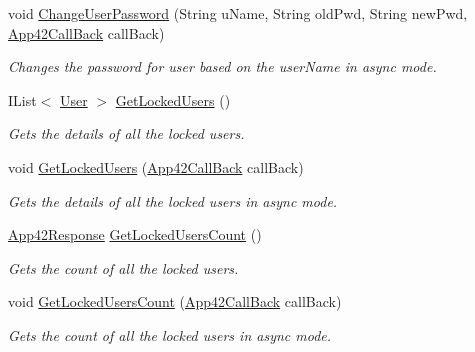 \begin{DoxyCompactItemize}
void \hyperlink{classcom_1_1shephertz_1_1app42_1_1paas_1_1sdk_1_1csharp_1_1user_1_1_user_service_a36687b837e50b3af4fd3d7345bb0870f}{Change\+User\+Password} (String u\+Name, String old\+Pwd, String new\+Pwd, \hyperlink{interfacecom_1_1shephertz_1_1app42_1_1paas_1_1sdk_1_1csharp_1_1_app42_call_back}{App42\+Call\+Back} call\+Back)
\begin{DoxyCompactList}\small\item\em Changes the password for user based on the user\+Name in async mode. \end{DoxyCompactList}\item 
I\+List$<$ \hyperlink{classcom_1_1shephertz_1_1app42_1_1paas_1_1sdk_1_1csharp_1_1user_1_1_user}{User} $>$ \hyperlink{classcom_1_1shephertz_1_1app42_1_1paas_1_1sdk_1_1csharp_1_1user_1_1_user_service_aff1be7b727a2fa18512172abaaf5d199}{Get\+Locked\+Users} ()
\begin{DoxyCompactList}\small\item\em Gets the details of all the locked users. \end{DoxyCompactList}\item 
void \hyperlink{classcom_1_1shephertz_1_1app42_1_1paas_1_1sdk_1_1csharp_1_1user_1_1_user_service_a4465a50c05d6de4669c5d2b7b0bbcf50}{Get\+Locked\+Users} (\hyperlink{interfacecom_1_1shephertz_1_1app42_1_1paas_1_1sdk_1_1csharp_1_1_app42_call_back}{App42\+Call\+Back} call\+Back)
\begin{DoxyCompactList}\small\item\em Gets the details of all the locked users in async mode. \end{DoxyCompactList}\item 
\hyperlink{classcom_1_1shephertz_1_1app42_1_1paas_1_1sdk_1_1csharp_1_1_app42_response}{App42\+Response} \hyperlink{classcom_1_1shephertz_1_1app42_1_1paas_1_1sdk_1_1csharp_1_1user_1_1_user_service_a10bd45c082eb0daf550882d3a323c3e4}{Get\+Locked\+Users\+Count} ()
\begin{DoxyCompactList}\small\item\em Gets the count of all the locked users. \end{DoxyCompactList}\item 
void \hyperlink{classcom_1_1shephertz_1_1app42_1_1paas_1_1sdk_1_1csharp_1_1user_1_1_user_service_a4addb30bf4388f9b514dc7d72f1dc295}{Get\+Locked\+Users\+Count} (\hyperlink{interfacecom_1_1shephertz_1_1app42_1_1paas_1_1sdk_1_1csharp_1_1_app42_call_back}{App42\+Call\+Back} call\+Back)
\begin{DoxyCompactList}\small\item\em Gets the count of all the locked users in async mode. \end{DoxyCompactList}\item 

\end{DoxyCompactItemize}
